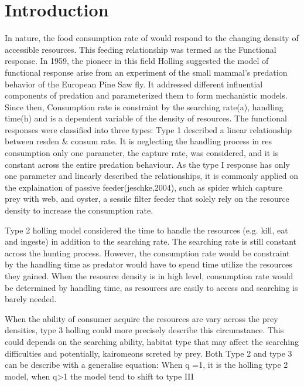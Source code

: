 \documentclass[11pt, a4paper]{article}
\begin{document}
\section{Introduction}
In nature, the food consumption rate of would respond to the changing density of accessible resources. This feeding relationship was termed as the Functional response. In 1959, the pioneer in this field Holling suggested the model of functional response arise from an experiment of the small mammal's predation behavior of the European Pine Saw fly. It addressed different influential components of predation and parameterized them to form mechanistic models. Since then, 
Consumption rate is constraint by the searching rate(a), handling time(h) and is a dependent variable of the density of resources. 
The functional responses were classified into three types:
Type 1 described a linear relationship between resden & consum rate. It is neglecting the handling process in res consumption only one parameter, the capture rate, was considered, and it is constant across the entire predation behaviour. As the type I response has only one parameter and linearly described the relationships, it is commonly applied on the explaination of passive feeder(jeschke,2004), such as spider which capture prey with web, and oyster, a sessile filter feeder that solely rely on the resource density to increase the  consumption rate.

Type 2 holling model considered the time to handle the resources (e.g. kill, eat and ingeste) in addition to the searching rate. The searching rate is still constant across the hunting process. However, the consumption rate would be constraint by the handling time as predator would have to spend time utilize the resources they gained. When the resource density is in high level, consumption rate would be determined by handling time, as resources are easily to access and searching is barely needed.

When the ability of consumer acquire the resources are vary across the prey densities, type 3 holling could more precisely describe this circumstance. This could depends on the searching ability, habitat type that may affect the searching difficulties and potentially,  kairomeons screted by prey. Both Type 2 and type 3 can be describe with a generalise equation: 
When q =1, it is the holling type 2 model, when q>1 the model tend to shift to type III
\end{document}
